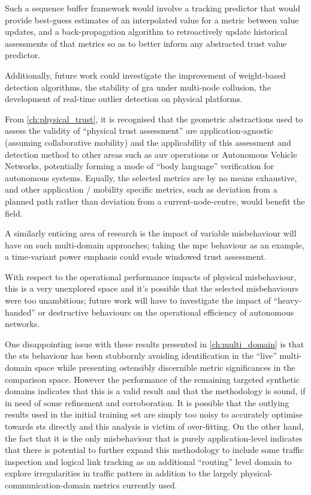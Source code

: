 Such a sequence buffer framework would involve a tracking predictor that would provide best-guess estimates of an interpolated value for a metric between value updates, and a back-propagation algorithm to retroactively update historical assessments of that metrics so as to better inform any abstracted trust value predictor.

Additionally, future work could investigate the improvement of weight-based detection algorithms, the stability of \gls{gra} under multi-node collusion, the development of real-time outlier detection on physical platforms.

From \autoref{ch:physical_trust}, it is recognised that the geometric abstractions used to assess the validity of ``physical trust assessment'' are application-agnostic (assuming collaborative mobility) and the applicability of this assessment and detection method to other areas such as \gls{auv} operations or Autonomous Vehicle Networks, potentially forming a mode of ``body language'' verification for autonomous systems. 
Equally, the selected metrics are by no means exhaustive, and other application / mobility specific metrics, such as deviation from a planned path rather than deviation from a current-node-centre, would benefit the field.

A similarly enticing area of research is the impact of variable misbehaviour will have on such multi-domain approaches; taking the \gls{mpc} behaviour as an example, a time-variant power emphasis could evade windowed trust assessment.

With respect to the operational performance impacts of physical misbehaviour, this is a very unexplored space and it's possible that the selected misbehaviours were too unambitious; future work will have to investigate the impact of ``heavy-handed'' or destructive behaviours on the operational efficiency of autonomous networks.

One disappointing issue with these results presented in \autoref{ch:multi_domain} is that the \gls{sts} behaviour has been stubbornly avoiding identification in the ``live'' multi-domain space while presenting ostensibly discernible metric significances in the comparison space. 
However the performance of the remaining targeted synthetic domains indicates that this is a valid result and that the methodology is sound, if in need of some refinement and corroboration.
It is possible that the outlying results used in the initial training set are simply too noisy to accurately optimise towards \gls{sts} directly and this analysis is victim of over-fitting. 
On the other hand, the fact that it is the only misbehaviour that is purely application-level indicates that there is potential to further expand this methodology to include some traffic inspection and logical link tracking as an additional ``routing'' level domain to explore irregularities in traffic patters in addition to the largely physical-communication-domain metrics currently used.

